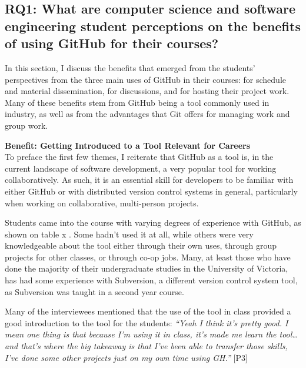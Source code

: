 

\subsection{RQ1: What are computer science and software engineering student perceptions on the benefits of using GitHub for their courses?}
In this section, I discuss the benefits that emerged from the students' perspectives from the three main uses of GitHub in their courses: for schedule and material dissemination, for discussions, and for hosting their project work. Many of these benefits stem from GitHub being a tool commonly used in industry, as well as from the advantages that Git offers for managing work and group work.

\textbf{Benefit: Getting Introduced to a Tool Relevant for Careers} \\

To preface the first few themes, I reiterate that GitHub as a tool is, in the current landscape of software development, a very popular tool for working collaboratively. As such, it is an essential skill for developers to be familiar with either GitHub or with distributed version control systems in general, particularly when working on collaborative, multi-person projects.

Students came into the course with varying degrees of experience with GitHub, as shown on table x . Some hadn't used it at all, while others were very knowledgeable about the tool either through their own uses, through group projects for other classes, or through co-op jobs. Many, at least those who have done the majority of their undergraduate studies in the University of Victoria, has had some experience with Subversion, a different version control system tool, as Subversion was taught in a second year course.

Many of the interviewees mentioned that the use of the tool in class provided a good introduction to the tool for the students: \textit{``Yeah I think it's pretty good. I mean one thing is that because I'm using it in class, it's made me learn the tool\ldots and that's where the big takeaway is that I've been able to transfer those skills, I've done some other projects just on my own time using GH.''} [P3]

